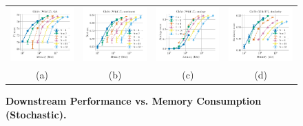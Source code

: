 \begin{figure}
	\centering
	\begin{tabular}{@{\hskip -0.0in}c@{\hskip -0.0in}c@{\hskip -0.0in}c@{\hskip -0.0in}c@{\hskip -0.0in}}
		\includegraphics[width=.245\linewidth]{figures/glove-wiki400k-am_qa_best-f1_vs_compression_linx_stoc_uni-quant-only.pdf} &
		\includegraphics[width=.245\linewidth]{figures/glove-wiki400k-am_sentiment_sst_test-acc_vs_compression_linx_stoc_uni-quant-only.pdf} &
		\includegraphics[width=.245\linewidth]{figures/glove-wiki400k-am_intrinsics_google-mul_vs_compression_linx_stoc_uni-quant-only.pdf} &
		\includegraphics[width=.245\linewidth]{figures/glove-wiki400k-am_intrinsics_bruni_men_vs_compression_linx_stoc_uni-quant-only.pdf} \\
		\;\;\;\;\;(a) & \;\;\;\;\;\;(b) & \;\;\;\;\;\;(c) & \;\;\;\;\;\;(d)
	\end{tabular}
	\caption{
		\textbf{Downstream Performance vs. Memory Consumption (Stochastic).}	}
	\label{fig:perf_comp_wiki17only_stoc}
\end{figure}


